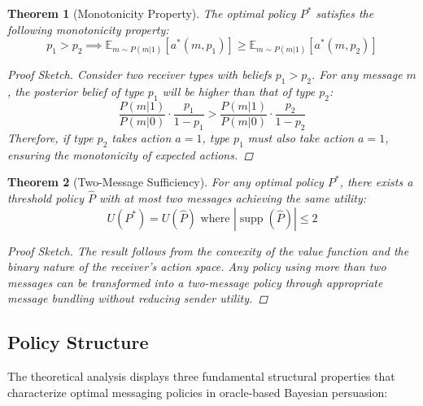 \documentclass[12pt]{article}
\theoremstyle{plain}
\newtheorem{theorem}{Theorem}[section]
\theoremstyle{definition}
\theoremstyle{remark}
\DeclareMathOperator{\supp}{supp}
\newcommand{\prob}[2]{P(#1|#2)}
\newcommand{\expect}[2]{\mathbb{E}_{#1}\left[#2\right]}
\begin{document}
\begin{theorem}[Monotonicity Property]
The optimal policy $P^*$ satisfies the following monotonicity property:
\[p_1 > p_2 \implies \expect{m\sim\prob{m}{1}}{a^*(m,p_1)} \geq \expect{m\sim\prob{m}{1}}{a^*(m,p_2)}\]

\begin{proof}[Proof Sketch]
Consider two receiver types with beliefs $p_1 > p_2$. For any message $m$, the posterior belief of type $p_1$ will be higher than that of type $p_2$:
\[\frac{\prob{m}{1}}{\prob{m}{0}} \cdot \frac{p_1}{1-p_1} > \frac{\prob{m}{1}}{\prob{m}{0}} \cdot \frac{p_2}{1-p_2}\]
Therefore, if type $p_2$ takes action $a=1$, type $p_1$ must also take action $a=1$, ensuring the monotonicity of expected actions.
\end{proof}
\end{theorem}

\begin{theorem}[Two-Message Sufficiency]
For any optimal policy $P^*$, there exists a threshold policy $\hat{P}$ with at most two messages achieving the same utility:
\[U(P^*) = U(\hat{P}) \text{ where } |\supp(\hat{P})| \leq 2\]

\begin{proof}[Proof Sketch]
The result follows from the convexity of the value function and the binary nature of the receiver's action space. Any policy using more than two messages can be transformed into a two-message policy through appropriate message bundling without reducing sender utility.
\end{proof}
\end{theorem}

\subsection{Policy Structure}
The theoretical analysis displays three fundamental structural properties that characterize optimal messaging policies in oracle-based Bayesian persuasion:
\end{document}
